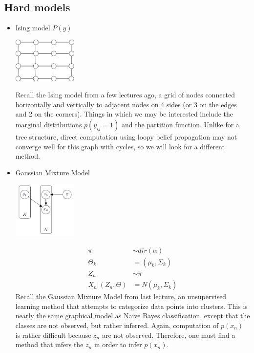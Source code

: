 \documentclass{article}
\begin{document}
\subsection{Hard models}
\begin{itemize}
\item Ising model $P(y)$\\
\centerline{\includegraphics[width=0.25\textwidth]{fig/ising_1.pdf}}
\newline Recall the Ising model from a few lectures ago, a grid of nodes connected horizontally and vertically to adjacent nodes on 4 sides (or 3 on the edges and 2 on the corners).  Things in which we may be interested include the marginal distributions $p(y_{ij}=1)$ and the partition function.  Unlike for a tree structure, direct computation using loopy belief propagation may not converge well for this graph with cycles, so we will look for a different method.
\item Gaussian Mixture Model \\
\centerline{\includegraphics[width=0.25\textwidth]{fig/gmm.pdf}}
\begin{align*}
\pi & \sim dir(\alpha) \\
\Theta_k &= (\mu_k, \Sigma_k) \\
Z_n &\sim \pi \\
X_n | (Z_n, \Theta) &= N (\mu_k, \Sigma_k)
\end{align*}
Recall the Gaussian Mixture Model from last lecture, an unsupervised learning method that attempts to categorize data points into clusters.  This is nearly the same graphical model as Naive Bayes classification, except that the classes are not observed, but rather inferred.  Again, computation of $p(x_n)$ is rather difficult because $z_n$ are not observed.  Therefore, one must find a method that infers the $z_n$ in order to infer $p(x_n)$.
\end{itemize}
\end{document}
